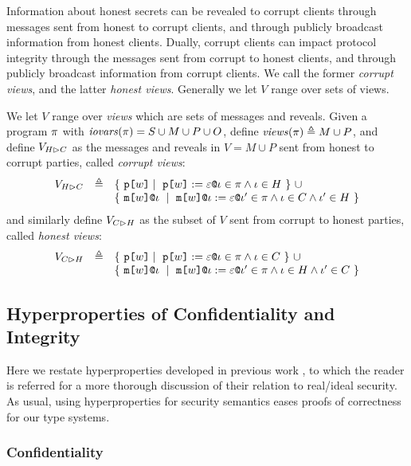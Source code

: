 Information about honest secrets can be revealed to corrupt clients
through messages sent from honest to corrupt clients, and through
publicly broadcast information from honest clients. Dually,
corrupt clients can impact protocol integrity through the messages
sent from corrupt to honest clients, and through publicly broadcast information
from corrupt clients. We call the former \emph{corrupt views}, and
the latter \emph{honest views}. Generally we let $V$ range over sets
of views.
\begin{definition}
  We let $V$ range over \emph{views} which are sets of messages
  and reveals. Given a program $\pi$ with $\mathit{iovars}(\pi) = S \cup M \cup P \cup O$,
  define $\mathit{views}(\pi) \triangleq M \cup P$, and define $V_{H \rhd C}$ as
  the messages and reveals in $V = M \cup P$ sent from honest to corrupt
  parties, called \emph{corrupt views}:
  $$
  \begin{array}{lcl}
    \houtputs & \defeq
        & \{\ \rvl{w} \mid\ \reveal{w}{\be}{\cid} \in \prog \wedge \cid \in H \ \}\ \cup \\
      & & \{\ \elab{\mesg{w}}{\cid}\ \mid\  \eassign{\mesg{w}}{\cid}{\be}{\cid'} \in
           \prog \wedge \cid \in C \wedge \cid' \in H \ \} 
  \end{array}
  $$
  and similarly define $V_{C \rhd H}$ as the subset of $V$ sent from corrupt to honest
  parties, called \emph{honest views}:
  $$
  \begin{array}{lcl}
    \cinputs &  \defeq
        & \{\ \rvl{w} \mid\ \reveal{w}{\be}{\cid} \in \prog \wedge \cid \in C \ \} \ \cup\\
      & & \{\ \elab{\mesg{w}}{\cid}\ \mid\  \eassign{\mesg{w}}{\cid}{\be}{\cid'} \in
              \prog \wedge \cid \in H \wedge \cid' \in C \ \}
  \end{array}
  $$
\end{definition}

\subsection{Hyperproperties of Confidentiality and Integrity}

Here we restate hyperproperties developed in previous work
\cite{skalka-near-ppdp24}, to which the reader is referred for a more
thorough discussion of their relation to real/ideal security.  As
usual, using hyperproperties for security semantics eases proofs of
correctness for our type systems.

\subsubsection{Confidentiality}

